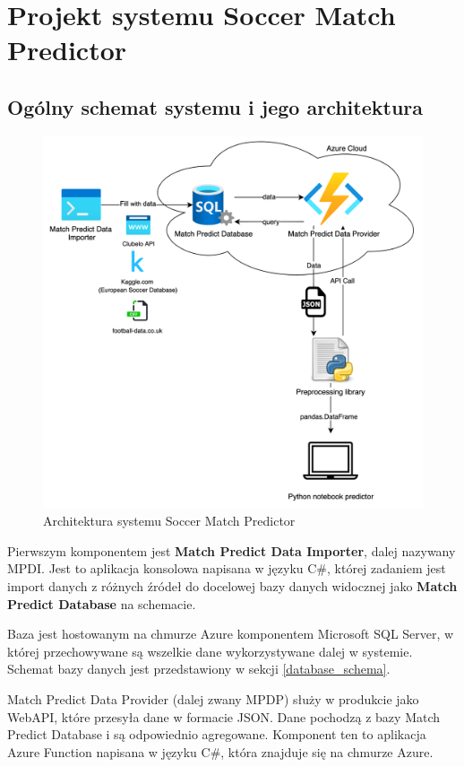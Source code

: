 \chapter{Projekt systemu Soccer Match Predictor}
\section{Ogólny schemat systemu i jego architektura}
    \begin{figure}[h] 
        \centering\includegraphics[width=\textwidth]{figures/MatchPredictorArchitecture.png}
        \caption{Architektura systemu Soccer Match Predictor}\label{fig:arch1}
    \end{figure}
    \newpage

Pierwszym komponentem jest \textbf{Match Predict Data Importer}, dalej nazywany MPDI. Jest to aplikacja konsolowa napisana w języku C\#, której zadaniem jest import danych z różnych źródeł do docelowej bazy danych widocznej jako \textbf{Match Predict Database} na schemacie.

Baza jest hostowanym na chmurze Azure komponentem Microsoft SQL Server, w której przechowywane są wszelkie dane wykorzystywane dalej w systemie. Schemat bazy danych jest przedstawiony w sekcji \ref{database_schema}.

Match Predict Data Provider (dalej zwany MPDP) służy w produkcie jako WebAPI, które przesyła dane w formacie JSON. Dane pochodzą z bazy Match Predict Database i są odpowiednio agregowane. Komponent ten to aplikacja Azure Function napisana w języku C\#, która znajduje się na chmurze Azure.\\




